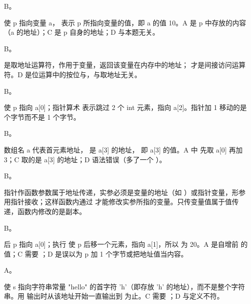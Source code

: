 \documentclass[a4paper,11pt]{article}
\begin{document}


\q B。\begin{analysis} 使 p 指向变量 a， 表示 p 所指向变量的值，即 a 的值 10。A 是 p 中存放的内容（a 的地址）；C 是 p 自身的地址；D 与本题无关。\end{analysis}

\q B。\begin{analysis}\code{\&} 是取地址运算符，作用于变量，返回该变量在内存中的地址；\code{*} 才是间接访问运算符。D 是位运算中的按位与，与取地址无关。\end{analysis}

\q B。\begin{analysis} 使 p 指向 a[0]；指针算术  表示跳过 2 个 int 元素，指向 a[2]。指针加 1 移动的是  个字节而不是 1 个字节。\end{analysis}

\q B。\begin{analysis}数组名 a 代表首元素地址， 是 a[3] 的地址， 即 a[3] 的值。A 中  先取 a[0] 再加 3；C 取的是 a[3] 的地址；D 语法错误（多了一个 \code{*}）。\end{analysis}

\q B。\begin{analysis}指针作函数参数属于地址传递，实参必须是变量的地址（如 ）或指针变量，形参用指针接收；这样函数内通过  才能修改实参所指的变量。只传变量值属于值传递，函数内修改的是副本。\end{analysis}

\q B。\begin{analysis} 后 p 指向 a[0]；执行  使 p 后移一个元素，指向 a[1]，所以  为 20。A 是自增前  的值；C 需要 ；D 是误以为 p 加 1 个字节或把地址值当内容。\end{analysis}

\q A。\begin{analysis} 使 s 指向字符串常量 "hello" 的首字符 'h'（即存放 'h' 的地址），而不是整个字符串。用  输出时从该地址开始一直输出到  为止。C 需要 ；D 与定义不符。\end{analysis}
\end{document}
